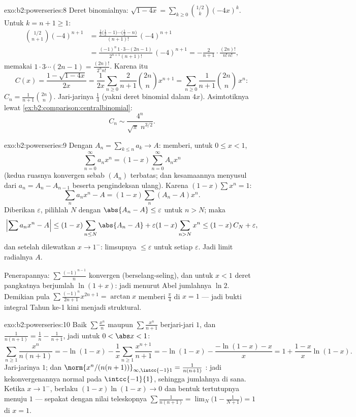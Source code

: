 \begin{solution}{exo:b2:powerseries:8}
Deret binomialnya: $\sqrt{1-4x} = \sum_{k\geq0}
\binom{1/2}{k}(-4x)^k$. Untuk $k = n + 1 \geq 1$:
\begin{align*}
\binom{1/2}{n+1}(-4)^{n+1}
&= \frac{\frac12\bigl(\frac12 - 1\bigr)\cdots\bigl(\frac12 -
n\bigr)}{(n+1)!}\,(-4)^{n+1}\\
&= \frac{(-1)^n\,1\cdot3\cdots(2n-1)}{2^{n+1}(n+1)!}\,(-4)^{n+1}
= -\frac{2}{n+1}\cdot\frac{(2n)!}{n!\,n!} ,
\end{align*}
memakai $1\cdot3\cdots(2n-1) = \frac{(2n)!}{2^n n!}$. Karena itu
\[
C(x) = \frac{1 - \sqrt{1-4x}}{2x}
= \frac{1}{2x}\sum_{n\geq0}\frac{2}{n+1}\binom{2n}{n}x^{n+1}
= \sum_{n\geq0} \frac{1}{n+1}\binom{2n}{n}\,x^n :
\]
$C_n = \frac{1}{n+1}\binom{2n}{n}$. Jari-jarinya $\frac14$ (yakni deret
binomial dalam $4x$). Asimtotiknya lewat
\cref{ex:b2:comparison:centralbinomial}:
\[
C_n \sim \frac{4^n}{\sqrt{\pi}\; n^{3/2}} .
\]
\end{solution}

\begin{solution}{exo:b2:powerseries:9}
Dengan $A_n = \sum_{k \leq n} a_k \to A$:  memberi, untuk
$0 \leq x < 1$,
\[
\sum_{n=0}^{\infty} a_n x^n = (1 - x)\sum_{n=0}^{\infty} A_n x^n
\]
(kedua ruasnya konvergen sebab $(A_n)$ terbatas; dan kesamaannya menyusul
dari $a_n = A_n - A_{n-1}$ beserta pengindeksan ulang). Karena $(1 -
x)\sum x^n = 1$:
\[
\sum_n a_nx^n - A = (1-x)\sum_{n} (A_n - A)x^n .
\]
Diberikan $\varepsilon$, pilihlah $N$ dengan $\abs{A_n - A} \leq
\varepsilon$ untuk $n > N$; maka
\[
\Bigl|\sum a_nx^n - A\Bigr|
\leq (1-x)\sum_{n \leq N}\abs{A_n - A} + \varepsilon(1 -
x)\sum_{n > N}x^n
\leq (1-x)\,C_N + \varepsilon ,
\]
dan setelah dilewatkan $x \to 1^-$: limsupnya $\leq \varepsilon$ untuk
setiap $\varepsilon$. Jadi limit radialnya $A$.

Penerapannya: $\sum \frac{(-1)^{n-1}}{n}$ konvergen (berselang-seling),
dan untuk $x < 1$ deret pangkatnya berjumlah $\ln(1 + x)$: jadi menurut
Abel jumlahnya $\ln 2$. Demikian pula $\sum\frac{(-1)^n}{2n+1}x^{2n+1} =
\arctan x$ memberi $\frac\pi4$ di $x = 1$ --- jadi bukti integral
Tahun ke-1 kini menjadi struktural.
\end{solution}

\begin{solution}{exo:b2:powerseries:10}
Baik $\sum\frac{x^n}{n}$ maupun $\sum\frac{x^n}{n+1}$ berjari-jari
$1$, dan $\frac{1}{n(n+1)} = \frac1n - \frac1{n+1}$, jadi untuk $0
< \abs x < 1$:
\[
\sum_{n\geq1}\frac{x^n}{n(n+1)}
= -\ln(1-x) - \frac1x\sum_{n\geq1}\frac{x^{n+1}}{n+1}
= -\ln(1-x) - \frac{-\ln(1-x) - x}{x}
= 1 + \frac{1-x}{x}\ln(1-x) .
\]
Jari-jarinya $1$; dan $\norm{x^n/(n(n+1))}_{\infty,\intcc{-1}1} =
\frac{1}{n(n+1)}$ : jadi kekonvergenannya normal pada
$\intcc{-1}{1}$, sehingga jumlahnya  di sana. Ketika $x \to
1^-$, berlaku $(1-x)\ln(1-x) \to 0$ dan bentuk tertutupnya menuju $1$ ---
sepakat dengan nilai teleskopnya $\sum\frac{1}{n(n+1)} =
\lim_N\bigl(1 - \frac{1}{N+1}\bigr) = 1$ di $x = 1$.
\end{solution}

